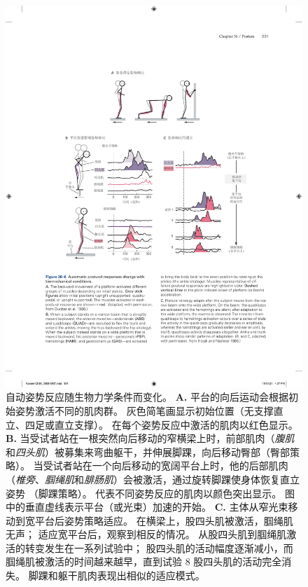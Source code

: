 \begin{figure}[htbp]
	\centering
	\includegraphics[width=1.0\linewidth]{chap36/fig_36_6}
	\caption{自动姿势反应随生物力学条件而变化。
		\textbf{A.} 平台的向后运动会根据初始姿势激活不同的肌肉群。
		灰色简笔画显示初始位置（无支撑直立、四足或直立支撑）。
		在每个姿势反应中激活的肌肉以红色显示\cite{dunbar1986neural}。
		\textbf{B.} 当受试者站在一根突然向后移动的窄横梁上时，前部肌肉（\textit{腹肌}和\textit{四头肌}）被募集来弯曲躯干，并伸展脚踝，向后移动臀部（臀部策略）。
		当受试者站在一个向后移动的宽阔平台上时，他的后部肌肉（\textit{椎旁}、\textit{腘绳肌}和\textit{腓肠肌}）会被激活，通过旋转脚踝使身体恢复直立姿势 （脚踝策略）。
		代表不同姿势反应的肌肉以颜色突出显示。 图中的垂直虚线表示平台（或光束）加速的开始。
		\textbf{C.} 主体从窄光束移动到宽平台后姿势策略适应。
		在横梁上，股四头肌被激活，腘绳肌无声；
		适应宽平台后，观察到相反的情况。
		从股四头肌到腘绳肌激活的转变发生在一系列试验中；
		股四头肌的活动幅度逐渐减小，而腘绳肌被激活的时间越来越早，直到试验 8 股四头肌的活动完全消失。
		脚踝和躯干肌肉表现出相似的适应模式\cite{horak1986central}。}
	\label{fig:36_6}
\end{figure}


